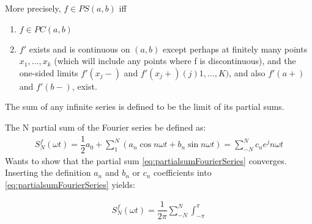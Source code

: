 More precisely, $f\in PS(a,b)$ iff 
\begin{enumerate}
	\item $f \in PC(a,b)$
	\item $f'$ exists and is continuous on $(a,b)$ except perhaps at finitely many points $x_1,\dots,x_k$ (which will include any points where f is discontinuous), and the one-sided limits $f'(x_j-)$ and $f'(x_j+)(j)1,\dots,K)$, and also $f'(a+)$ and $f'(b-)$, exist.
\end{enumerate}

The sum of any infinite series is defined to be the limit of its partial sums.

The N partial sum of the Fourier series be defined as:
\begin{align}\label{eq:partialsumFourierSeries}
	S_N^f(\omega t) = \dfrac{1}{2} a_0 + \sum_1^N\left(a_n \cos n\omega t + b_n \sin n \omega t \right) = \sum_{-N}^N c_n e^jn\omega t
\end{align}
Wants to show that the partial sum \eqref{eq:partialsumFourierSeries} converges.
Inserting the definition $a_n$ and $b_n$ or $c_n$ coefficients into \eqref{eq:partialsumFourierSeries} yields:

\begin{align*}
	S_N^f(\omega t) = \dfrac{1}{2\pi} \sum_{-N}^N \int_{-\pi}^\pi 
\end{align*}

